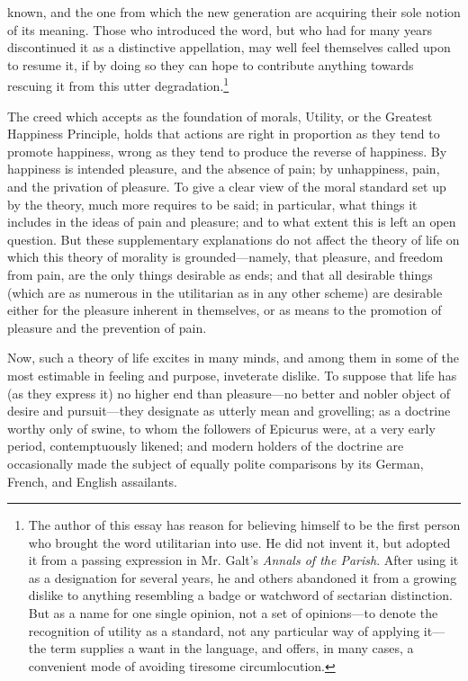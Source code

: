 known, and the one from which the new generation are acquiring their
sole notion of its meaning. Those who introduced the word, but who had
for many years discontinued it as a distinctive appellation, may well
feel themselves called upon to resume it, if by doing so they can hope
to contribute anything towards rescuing it from this utter
degradation.\footnote{The author of this essay has reason for
believing himself to be the first person who brought the word
utilitarian into use. He did not invent it, but adopted it from a
passing expression in Mr. Galt's \textit{Annals of the Parish}. After
using it as a designation for several years, he and others abandoned
it from a growing dislike to anything resembling a badge or watchword
of sectarian distinction. But as a name for one single opinion, not a
set of o\-pin\-ions---to denote the recognition of utility as a
standard, not any particular way of applying it---the term supplies a
want in the language, and offers, in many cases, a convenient mode of
avoiding tiresome circumlocution.}

The creed which accepts as the foundation of morals, Utility, or the
Greatest Happiness Principle, holds that actions are right in
proportion as they tend to promote happiness, wrong as they tend to
produce the  reverse of happiness. By happiness is intended
pleasure, and the absence of pain; by unhappiness, pain, and the
privation of pleasure. To give a clear view of the moral standard set
up by the theory, much more requires to be said; in particular, what
things it includes in the ideas of pain and pleasure; and to what
extent this is left an open question. But these supplementary
explanations do not affect the theory of life on which this theory of
morality is ground\-ed---name\-ly, that pleasure, and freedom from
pain, are the only things desirable as ends; and that all desirable
things (which are as numerous in the utilitarian as in any other
scheme) are desirable either for the pleasure inherent in themselves,
or as means to the promotion of pleasure and the prevention of pain.

Now, such a theory of life excites in many minds, and among them in
some of the most estimable in feeling and purpose, inveterate dislike.
To suppose that life has (as they express it) no higher end than
pleas\-ure---no better and nobler object of desire and
pur\-suit---they designate as utterly mean and grovelling; as a
doctrine worthy only of swine, to whom the followers of Epicurus were,
at a very early period, contemptuously likened; and modern holders of
the doctrine are occasionally made the subject of equally polite
comparisons by its German, French, and English assailants.

